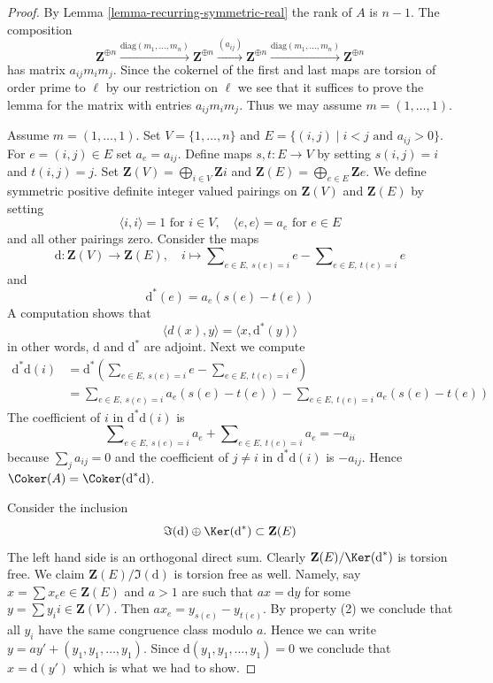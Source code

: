 \begin{proof}
By Lemma \ref{lemma-recurring-symmetric-real} the rank of $A$ is $n - 1$.
The composition
$$
\mathbf{Z}^{\oplus n} \xrightarrow{\text{diag}(m_1, \ldots, m_n)}
\mathbf{Z}^{\oplus n} \xrightarrow{(a_{ij})}
\mathbf{Z}^{\oplus n} \xrightarrow{\text{diag}(m_1, \ldots, m_n)}
\mathbf{Z}^{\oplus n}
$$
has matrix $a_{ij}m_im_j$. Since the cokernel of the first and last
maps are torsion of order prime to $\ell$ by our restriction on $\ell$
we see that it suffices to prove the lemma for the matrix
with entries $a_{ij}m_im_j$. Thus we may assume $m = (1, \ldots, 1)$.

\medskip\noindent
Assume $m = (1, \ldots, 1)$. Set $V = \{1, \ldots, n\}$ and
$E = \{(i, j) \mid i < j\text{ and }a_{ij} > 0\}$. For
$e = (i, j) \in E$ set $a_e = a_{ij}$. Define maps
$s, t : E \to V$ by setting $s(i, j) = i$ and $t(i, j) = j$.
Set
$\mathbf{Z}(V) = \bigoplus_{i \in V} \mathbf{Z}i$ and
$\mathbf{Z}(E) = \bigoplus_{e \in E} \mathbf{Z}e$.
We define symmetric positive definite integer valued pairings
on $\mathbf{Z}(V)$ and $\mathbf{Z}(E)$ by setting
$$
\langle i, i \rangle = 1\text{ for }i \in V, \quad
\langle e, e \rangle = a_e\text{ for }e \in E
$$
and all other pairings zero. Consider the maps
$$
\text{d} : \mathbf{Z}(V) \to \mathbf{Z}(E), \quad
i \longmapsto
\sum\nolimits_{e \in E,\ s(e) = i} e - \sum\nolimits_{e \in E,\ t(e) = i} e
$$
and
$$
\text{d}^*(e) = a_e(s(e) - t(e))
$$
A computation shows that
$$
\langle d(x), y\rangle = \langle x, \text{d}^*(y) \rangle
$$
in other words, $\text{d}$ and $\text{d}^*$ are adjoint. Next we compute
\begin{align*}
\text{d}^*\text{d}(i)
& = 
\text{d}^*(
\sum\nolimits_{e \in E,\ s(e) = i} e - \sum\nolimits_{e \in E,\ t(e) = i} e) \\
& =
\sum\nolimits_{e \in E,\ s(e) = i} a_e(s(e) - t(e)) -
\sum\nolimits_{e \in E,\ t(e) = i} a_e(s(e) - t(e))
\end{align*}
The coefficient of $i$ in $\text{d}^*\text{d}(i)$ is
$$
\sum\nolimits_{e \in E,\ s(e) = i} a_e +
\sum\nolimits_{e \in E,\ t(e) = i} a_e = - a_{ii}
$$
because $\sum_j a_{ij} = 0$ and the coefficient of
$j \not = i$ in $\text{d}^*\text{d}(i)$ is $-a_{ij}$.
Hence $\Coker(A) = \Coker(\text{d}^*\text{d})$.

\medskip\noindent
Consider the inclusion
$$
\Im(\text{d}) \oplus \Ker(\text{d}^*) \subset \mathbf{Z}(E)
$$
The left hand side is an orthogonal direct sum. Clearly
$\mathbf{Z}(E)/\Ker(\text{d}^*)$ is torsion free.
We claim $\mathbf{Z}(E)/\Im(\text{d})$ is torsion free as well.
Namely, say $x = \sum x_e e \in \mathbf{Z}(E)$ and $a > 1$ are such
that $ax = \text{d}y$ for some $y = \sum y_i i \in \mathbf{Z}(V)$.
Then $a x_e = y_{s(e)} - y_{t(e)}$. By property (2) we conclude
that all $y_i$ have the same congruence class modulo $a$.
Hence we can write $y = a y' + (y_1, y_1, \ldots, y_1)$.
Since $\text{d}(y_1, y_1, \ldots, y_1) = 0$ we conclude
that $x = \text{d}(y')$ which is what we had to show.


\end{proof}

